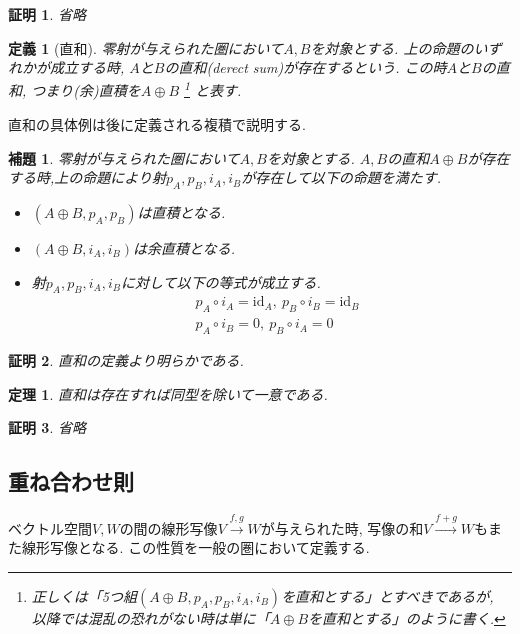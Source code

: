 \documentclass[a4paper,12pt]{ltjsarticle}
\theoremstyle{break}
\newtheorem{defn}[thm]{定義}
\newtheorem{lem}[thm]{補題}
\newtheorem{thrm}[thm]{定理}
\newtheorem*{prf}{証明}
\newcommand{\xr}[1]{\xrightarrow{#1}}
\newcommand{\id}{\mathrm{id}}
\newcommand{\ci}{\circ}
\newcommand{\opl}{\oplus}
\numberwithin{equation}{section}
\begin{document}
\begin{prf}
  省略
\end{prf}

\begin{defn}[直和]
  零射が与えられた圏において$A,B$を対象とする. 
  上の命題のいずれかが成立する時, $A$と$B$の直和(derect sum)が存在するという. 
  この時$A$と$B$の直和, つまり(余)直積を$A \opl B$
  \footnote{
    正しくは「5つ組$(A \opl B,p_A,p_B,i_A,i_B)$を直和とする」とすべきであるが, 以降では混乱の恐れがない時は単に「$A \opl B$を直和とする」のように書く. 
  }
  と表す. 
\end{defn}

直和の具体例は後に定義される複積で説明する. 

\begin{lem}
  零射が与えられた圏において$A,B$を対象とする. 
  $A,B$の直和$A \opl B$が存在する時,上の命題により射$p_A,p_B,i_A,i_B$が存在して以下の命題を満たす. 
  \begin{itemize}
    \item $(A \opl B,p_A,p_B)$は直積となる. 
    \item $(A \opl B,i_A,i_B)$は余直積となる. 
    \item 射$p_A,p_B,i_A,i_B$に対して以下の等式が成立する. 
    \begin{align*}
      &p_A \ci i_A = \id_A, ~ p_B \ci i_B = \id_B \\
      &p_A \ci i_B = 0, ~ p_B \ci i_A = 0
    \end{align*}
  \end{itemize}
\end{lem}

\begin{prf}
  直和の定義より明らかである. 
\end{prf}

\begin{thrm}
  直和は存在すれば同型を除いて一意である. 
\end{thrm}

\begin{prf}
  省略
\end{prf}

\subsection{重ね合わせ則}

ベクトル空間$V,W$の間の線形写像$V \xr{f,g} W$が与えられた時, 写像の和$V \xr{f+g} W$もまた線形写像となる. 
この性質を一般の圏において定義する. 
\end{document}
